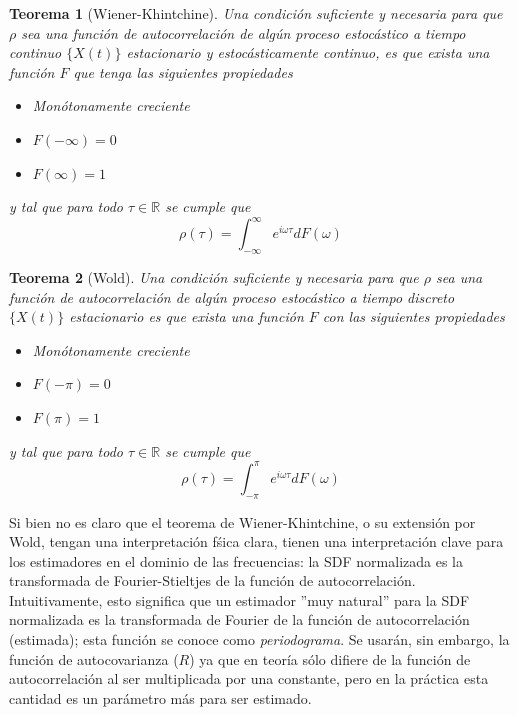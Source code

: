 \documentclass[12pt,a4paper]{mitthesis}
\newtheorem{thrm}{Teorema}
\newcommand{\R}{\mathbb{R}}
\newcommand{\intR}{\int_{-\infty}^{\infty}}
\newcommand{\intPI}{\int_{-\pi}^{\pi}}
\begin{document}
\begin{thrm}[Wiener-Khintchine]
Una condici\'on suficiente y necesaria para que $\rho$ sea una funci\'on de autocorrelaci\'on de 
alg\'un proceso estoc\'astico a tiempo continuo $\{X(t)\}$ estacionario y estoc\'asticamente 
continuo, es que exista una funci\'on $F$ que tenga las siguientes propiedades
\begin{itemize}
\item Monótonamente creciente
\item $F(-\infty) = 0$
\item $F(\infty) = 1$
\end{itemize}
y tal que para todo $\tau \in \R$ se cumple que
\begin{equation*}
\rho(\tau) = \intR e^{i \omega \tau} dF(\omega)
\end{equation*}
\end{thrm}

\begin{thrm}[Wold]
Una condici\'on suficiente y necesaria para que $\rho$ sea una funci\'on de autocorrelaci\'on de 
alg\'un proceso estoc\'astico a tiempo discreto $\{X(t)\}$ estacionario es que exista una funci\'on 
$F$ con las siguientes propiedades
\begin{itemize}
\item Monótonamente creciente
\item $F(-\pi) = 0$
\item $F(\pi) = 1$
\end{itemize}
y tal que para todo $\tau \in \R$ se cumple que
\begin{equation*}
\rho(\tau) = \intPI e^{i \omega \tau} dF(\omega)
\end{equation*}
\end{thrm}

Si bien no es claro que el teorema de Wiener-Khintchine, o su extensi\'on por Wold, tengan una 
interpretaci\'on f\'sica clara, tienen una interpretaci\'on clave para los estimadores en el 
dominio de las frecuencias: la SDF normalizada es la transformada de Fourier-Stieltjes de la 
funci\'on de autocorrelaci\'on.
Intuitivamente, esto significa que un estimador ''muy natural'' para la SDF normalizada es la 
transformada de Fourier de la funci\'on de autocorrelaci\'on (estimada); esta funci\'on se conoce 
como \textit{periodograma}. Se usar\'an, sin embargo, la funci\'on de autocovarianza ($R$) ya que 
en teor\'ia s\'olo difiere de la funci\'on de autocorrelaci\'on al ser multiplicada por una 
constante, pero en la pr\'actica esta cantidad es un par\'ametro m\'as para ser estimado.
\end{document}
